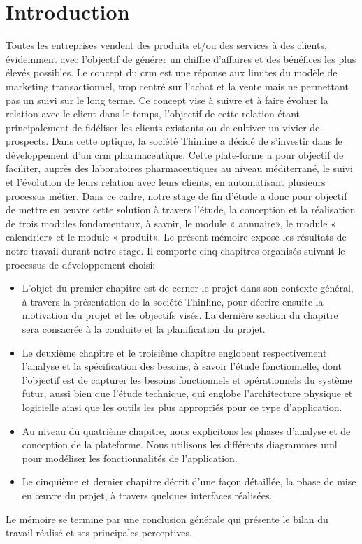 \chapter*{Introduction}

\begin{onehalfspace}
Toutes les entreprises vendent des produits et/ou des services à des clients, évidemment avec l’objectif de générer un chiffre d’affaires et des bénéfices les plus élevés possibles. Le concept du crm est une réponse aux limites du modèle de marketing transactionnel, trop centré sur l’achat et la vente mais ne permettant pas un suivi sur le long terme. Ce concept vise à suivre et à faire évoluer la relation avec le client dans le temps, l’objectif de cette relation étant principalement de fidéliser les clients existants ou de cultiver un vivier de prospects.
\newline
Dans cette optique, la société Thinline a décidé de s’investir dans le développement d'un crm pharmaceutique. Cette plate-forme a pour objectif de faciliter, auprès des laboratoires pharmaceutiques au niveau méditerrané, le suivi et l'évolution de leurs relation avec leurs clients, en automatisant plusieurs processus métier. Dans ce cadre, notre stage de fin d'étude a donc pour objectif de mettre en œuvre cette solution à travers l’étude, la conception et la réalisation de trois modules fondamentaux, à savoir, le module « annuaire», le module « calendrier» et le module « produit».
\newline
Le présent mémoire expose les résultats de notre travail durant notre stage. Il comporte cinq chapitres organisés suivant le processus de développement choisi:
\begin{itemize}
\item L’objet du premier chapitre est de cerner le projet dans son contexte général, à travers la présentation de la société Thinline, pour décrire ensuite la motivation du projet et les objectifs visés. La dernière section du chapitre sera consacrée à la conduite et la planification du projet.
\item Le deuxième chapitre et le troisième chapitre englobent respectivement l’analyse et la spécification des besoins, à savoir l'étude fonctionnelle, dont l’objectif est de capturer les besoins fonctionnels et opérationnels du système futur, aussi bien que l'étude technique, qui englobe l’architecture physique et logicielle ainsi que les outils les plus appropriés pour ce type d'application.
\item Au niveau du quatrième chapitre, nous explicitons les phases d’analyse et de conception de la plateforme. Nous utilisons les différents diagrammes uml pour modéliser les fonctionnalités de l’application.
\item Le cinquième et dernier chapitre décrit d’une façon détaillée, la phase de mise en œuvre du projet, à travers quelques interfaces réalisées.
\end{itemize}

\noindent Le mémoire se termine par une conclusion générale qui présente le bilan du travail réalisé et ses principales perceptives.





\clearpage

\end{onehalfspace}